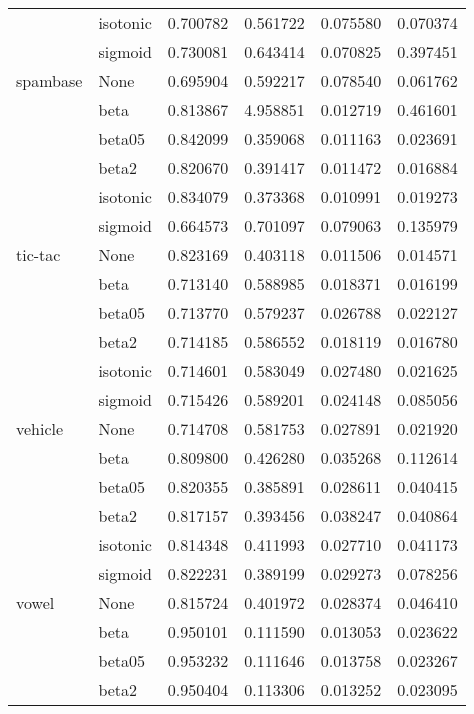 \begin{tabular}{llrrrr}
        & isotonic &  0.700782 &   0.561722 &  0.075580 &  0.070374 \\
        & sigmoid &  0.730081 &   0.643414 &  0.070825 &  0.397451 \\
spambase & None &  0.695904 &   0.592217 &  0.078540 &  0.061762 \\
        & beta &  0.813867 &   4.958851 &  0.012719 &  0.461601 \\
        & beta05 &  0.842099 &   0.359068 &  0.011163 &  0.023691 \\
        & beta2 &  0.820670 &   0.391417 &  0.011472 &  0.016884 \\
        & isotonic &  0.834079 &   0.373368 &  0.010991 &  0.019273 \\
        & sigmoid &  0.664573 &   0.701097 &  0.079063 &  0.135979 \\
tic-tac & None &  0.823169 &   0.403118 &  0.011506 &  0.014571 \\
        & beta &  0.713140 &   0.588985 &  0.018371 &  0.016199 \\
        & beta05 &  0.713770 &   0.579237 &  0.026788 &  0.022127 \\
        & beta2 &  0.714185 &   0.586552 &  0.018119 &  0.016780 \\
        & isotonic &  0.714601 &   0.583049 &  0.027480 &  0.021625 \\
        & sigmoid &  0.715426 &   0.589201 &  0.024148 &  0.085056 \\
vehicle & None &  0.714708 &   0.581753 &  0.027891 &  0.021920 \\
        & beta &  0.809800 &   0.426280 &  0.035268 &  0.112614 \\
        & beta05 &  0.820355 &   0.385891 &  0.028611 &  0.040415 \\
        & beta2 &  0.817157 &   0.393456 &  0.038247 &  0.040864 \\
        & isotonic &  0.814348 &   0.411993 &  0.027710 &  0.041173 \\
        & sigmoid &  0.822231 &   0.389199 &  0.029273 &  0.078256 \\
vowel & None &  0.815724 &   0.401972 &  0.028374 &  0.046410 \\
        & beta &  0.950101 &   0.111590 &  0.013053 &  0.023622 \\
        & beta05 &  0.953232 &   0.111646 &  0.013758 &  0.023267 \\
        & beta2 &  0.950404 &   0.113306 &  0.013252 &  0.023095 \\

\end{tabular}
